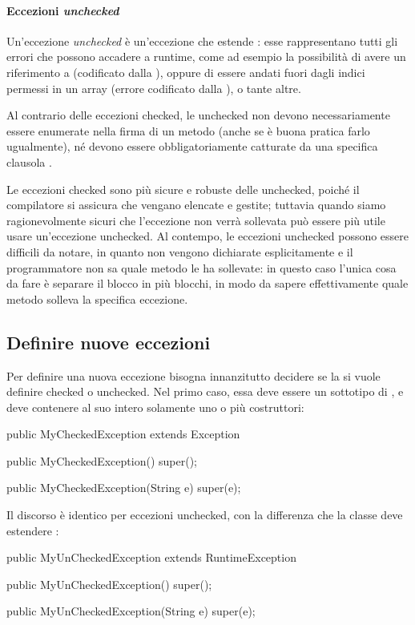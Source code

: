 \paragraph{Eccezioni \emph{unchecked}} Un'eccezione \emph{unchecked} è un'eccezione che estende : esse rappresentano tutti gli errori che possono accadere a runtime, come ad esempio la possibilità di avere un riferimento a  (codificato dalla ), oppure di essere andati fuori dagli indici permessi in un array (errore codificato dalla ), o tante altre.

Al contrario delle eccezioni checked, le unchecked non devono necessariamente essere enumerate nella firma di un metodo (anche se è buona pratica farlo ugualmente), né devono essere obbligatoriamente catturate da una specifica clausola .

Le eccezioni checked sono più sicure e robuste delle unchecked, poiché il compilatore si assicura che vengano elencate e gestite; tuttavia quando siamo ragionevolmente sicuri che l'eccezione non verrà sollevata può essere più utile usare un'eccezione unchecked. Al contempo, le eccezioni unchecked possono essere difficili da notare, in quanto non vengono dichiarate esplicitamente e il programmatore non sa quale metodo le ha sollevate: in questo caso l'unica cosa da fare è separare il blocco  in più blocchi, in modo da sapere effettivamente quale metodo solleva la specifica eccezione.

\subsection{Definire nuove eccezioni}

Per definire una nuova eccezione bisogna innanzitutto decidere se la si vuole definire checked o unchecked. Nel primo caso, essa deve essere un sottotipo di , e deve contenere al suo intero solamente uno o più costruttori: 
\begin{Java}
    public MyCheckedException extends Exception {
        public MyCheckedException(){
            super();
        }

        public MyCheckedException(String e){
            super(e);
        }
    }
\end{Java}
Il discorso è identico per eccezioni unchecked, con la differenza che la classe deve estendere :
\begin{Java}
    public MyUnCheckedException extends RuntimeException {
        public MyUnCheckedException(){
            super();
        }

        public MyUnCheckedException(String e){
            super(e);
        }
    }
\end{Java}

